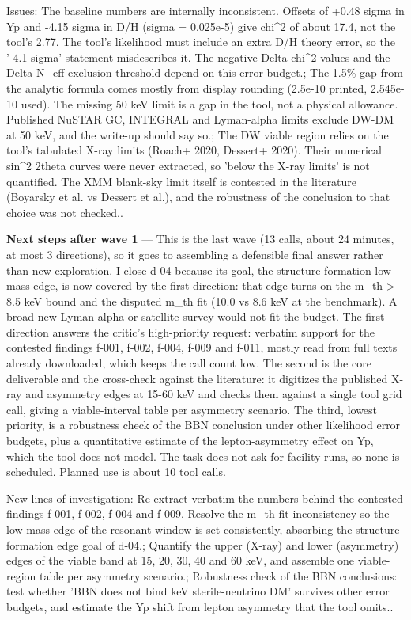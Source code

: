 \documentclass[11pt,a4paper]{article}
\begin{document}
Issues: The baseline numbers are internally inconsistent. Offsets of +0.48 sigma in Yp and -4.15 sigma in D/H (sigma = 0.025e-5) give chi\textasciicircum{}2 of about 17.4, not the tool's 2.77. The tool's likelihood must include an extra D/H theory error, so the '-4.1 sigma' statement misdescribes it. The negative Delta chi\textasciicircum{}2 values and the Delta N\_eff exclusion threshold depend on this error budget.; The 1.5\% gap from the analytic formula comes mostly from display rounding (2.5e-10 printed, 2.545e-10 used). The missing 50 keV limit is a gap in the tool, not a physical allowance. Published NuSTAR GC, INTEGRAL and Lyman-alpha limits exclude DW-DM at 50 keV, and the write-up should say so.; The DW viable region relies on the tool's tabulated X-ray limits (Roach+ 2020, Dessert+ 2020). Their numerical sin\textasciicircum{}2 2theta curves were never extracted, so 'below the X-ray limits' is not quantified. The XMM blank-sky limit itself is contested in the literature (Boyarsky et al. vs Dessert et al.), and the robustness of the conclusion to that choice was not checked..

\textbf{Next steps after wave 1} --- This is the last wave (13 calls, about 24 minutes, at most 3 directions), so it goes to assembling a defensible final answer rather than new exploration. I close d-04 because its goal, the structure-formation low-mass edge, is now covered by the first direction: that edge turns on the m\_th \textgreater{} 8.5 keV bound and the disputed m\_th fit (10.0 vs 8.6 keV at the benchmark). A broad new Lyman-alpha or satellite survey would not fit the budget. The first direction answers the critic's high-priority request: verbatim support for the contested findings f-001, f-002, f-004, f-009 and f-011, mostly read from full texts already downloaded, which keeps the call count low. The second is the core deliverable and the cross-check against the literature: it digitizes the published X-ray and asymmetry edges at 15-60 keV and checks them against a single tool grid call, giving a viable-interval table per asymmetry scenario. The third, lowest priority, is a robustness check of the BBN conclusion under other likelihood error budgets, plus a quantitative estimate of the lepton-asymmetry effect on Yp, which the tool does not model. The task does not ask for facility runs, so none is scheduled. Planned use is about 10 tool calls.

New lines of investigation: Re-extract verbatim the numbers behind the contested findings f-001, f-002, f-004 and f-009. Resolve the m\_th fit inconsistency so the low-mass edge of the resonant window is set consistently, absorbing the structure-formation edge goal of d-04.; Quantify the upper (X-ray) and lower (asymmetry) edges of the viable band at 15, 20, 30, 40 and 60 keV, and assemble one viable-region table per asymmetry scenario.; Robustness check of the BBN conclusions: test whether 'BBN does not bind keV sterile-neutrino DM' survives other error budgets, and estimate the Yp shift from lepton asymmetry that the tool omits..
\end{document}
